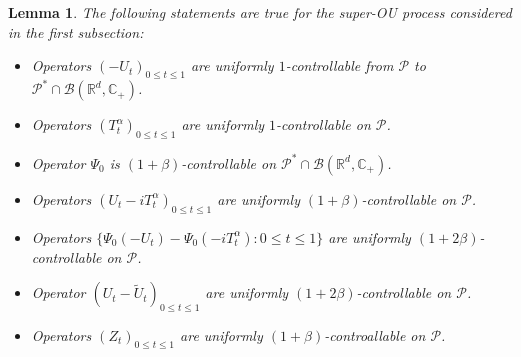 \documentclass[12pt,oneside,english]{amsart}
\theoremstyle{plain}
\newtheorem{lem}[thm]{Lemma}
\theoremstyle{definition}
\numberwithin{equation}{section}
\begin{document}
\begin{lem}
\label{lem: upper bound for usgx}
The following statements are true for the super-OU process considered in the first subsection:
\begin{itemize}
\item[(1)]
    Operators $(-U_t)_{0\leq t\leq 1}$ are uniformly $1$-controllable from $\mathcal P$ to $\mathcal P^*\cap \mathcal B(\mathbb R^d, \mathbb C_+)$.
\item[(2)]
    Operators $(T^\alpha_t)_{0\leq t\leq 1}$ are uniformly $1$-controllable on $\mathcal P$.
\item[(3)]
    Operator $\Psi_0$ is $(1+\beta)$-controllable on $\mathcal P^* \cap \mathcal B(\mathbb R^d, \mathbb C_+)$.
\item[(4)]
    Operators $(U_t- iT_t^{\alpha})_{0\leq t\leq 1}$ are uniformly $(1+\beta)$-controllable on $\mathcal P$.
\item[(5)]
    Operators $\{\Psi_0(-U_t) - \Psi_0(-iT_t^\alpha): 0\leq t\leq 1\}$ are uniformly $(1+2\beta)$-controllable on $\mathcal P$.
\item[(6)]
    Operator $(U_t-\tilde U_t)_{0\leq t\leq 1}$ are uniformly $(1+2\beta)$-controllable on $\mathcal P$.
\item[(7)]
    Operators $(Z_t)_{0\leq t\leq 1}$ are uniformly $(1+\beta)$-controallable on $\mathcal P$.
\end{itemize}
\end{lem}
\end{document}
